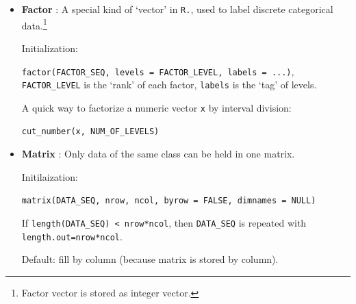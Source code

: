 \begin{itemize}[topsep=2pt,itemsep=0pt]
         

    \item \textbf{Factor} : A special kind of `vector' in \lstinline|R.|, used to label discrete categorical data.\footnote{Factor vector is stored as integer vector.}
    
    Initialization:

    \lstinline|factor(FACTOR_SEQ, levels = FACTOR_LEVEL, labels = ...)|, \lstinline|FACTOR_LEVEL| is the `rank' of each factor, \lstinline|labels| is the `tag' of levels. 

    A quick way to factorize a numeric vector \lstinline|x| by interval division:
    
    \lstinline|cut_number(x, NUM_OF_LEVELS)|

    \item \textbf{Matrix} : Only data of the same class can be held in one matrix.
    
    Initilaization:
    
    \lstinline|matrix(DATA_SEQ, nrow, ncol, byrow = FALSE, dimnames = NULL)|
    
    If \lstinline|length(DATA_SEQ) < nrow*ncol|, then \lstinline|DATA_SEQ| is repeated with \lstinline|length.out=nrow*ncol|. 
    
    Default: fill by column (because matrix is stored by column).


\end{itemize}
